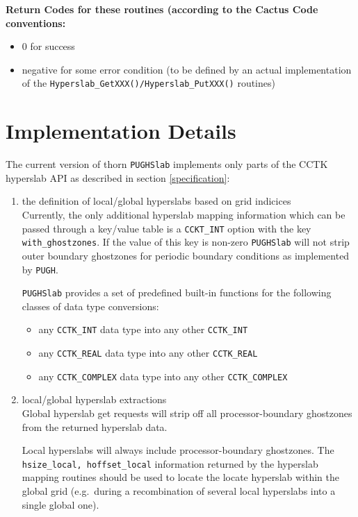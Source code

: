 \documentclass{article}
\begin{document}
{\bf Return Codes for these routines (according to the Cactus Code conventions:}
\begin{itemize}
  \item 0 for success
  \item negative for some error condition (to be defined by an actual
    implementation of the
    {\tt Hyperslab\_GetXXX()/Hyperslab\_PutXXX()} routines)
\end{itemize}

\section{Implementation Details}
\label{implementation}

The current version of thorn {\tt PUGHSlab} implements only parts of the
CCTK hyperslab API as described in section \ref{specification}:
\begin{enumerate}
  \item the definition of local/global hyperslabs based on grid indicices\\
    Currently, the only additional hyperslab mapping information which can be
    passed through a key/value table is a {\tt CCKT\_INT} option with the key
    {\tt with\_ghostzones}. If the value of this key is non-zero {\tt PUGHSlab}
    will not strip outer boundary ghostzones for periodic boundary conditions
    as implemented by {\tt PUGH}.

    {\tt PUGHSlab} provides a set of predefined built-in functions
    for the following classes of data type conversions:
    \begin{itemize}
      \item any {\tt CCTK\_INT} data type into any other {\tt CCTK\_INT}
      \item any {\tt CCTK\_REAL} data type into any other {\tt CCTK\_REAL}
      \item any {\tt CCTK\_COMPLEX} data type into any other {\tt CCTK\_COMPLEX}
    \end{itemize}

  \item local/global hyperslab extractions\\
    Global hyperslab get requests will strip off all processor-boundary
    ghostzones from the returned hyperslab data.

    Local hyperslabs will always include processor-boundary ghostzones.
    The {\tt hsize\_local, hoffset\_local} information returned by the
    hyperslab mapping routines should be used to locate the locate hyperslab
    within the global grid (e.g.\ during a recombination of several local
    hyperslabs into a single global one).
\end{enumerate}

\end{document}
